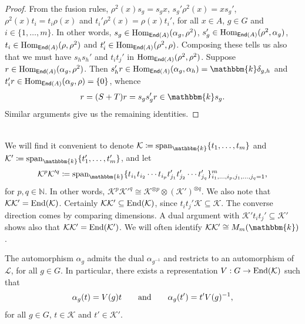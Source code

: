 \noindent\begin{proof} From the fusion rules, $\rho^2(x)s_g = s_gx$, $s_g'\rho^2(x) = xs_g'$, $\rho^2(x)t_i = t_i\rho(x)$ and $t_i'\rho^2(x) = \rho(x)t_i'$, for all $x \in A$, $g \in G$ and $i \in \{1, \dots, m\}$. In other words, $s_g \in \textup{Hom}_{\textup{\textsf{End}}(A)}(\alpha_g, \rho^2)$, $s_g' \in \textup{Hom}_{\textup{\textsf{End}}(A)}(\rho^2, \alpha_g)$, $t_i \in \textup{Hom}_{\textup{\textsf{End}}(A)}(\rho, \rho^2)$ and $t_i' \in \textup{Hom}_{\textup{\textsf{End}}(A)}(\rho^2, \rho)$. Composing these tells us also that we must have $s_hs_h'$ and $t_it_j'$ in $\textup{Hom}_{\textup{\textsf{End}}(A)}(\rho^2, \rho^2)$. Suppose $r \in \textup{Hom}_{\textup{\textsf{End}}(A)}(\alpha_g, \rho^2)$. Then $s_h'r \in \homset_{\textcat{End}(A)}(\alpha_g, \alpha_h) = \mathbbm{k}\delta_{g,h}$ and $t_i'r \in \textup{Hom}_{\textup{\textsf{End}}(A)}(\alpha_g, \rho) = \{0\}$, whence
\begin{align*}
r = (S + T)r = s_gs_g'r \in \mathbbm{k}s_g.
\end{align*}
\noindent Similar arguments give us the remaining identities. %
\end{proof}\\

\noindent We will find it convenient to denote $\mathcal{K} \coloneqq \textup{span}_\mathbbm{k}\{t_1, \dots, t_m\}$ and $\mathcal{K}' \coloneqq \textup{span}_\mathbbm{k}\{t_1', \dots, t_m'\}$, and let
\begin{align*}
\mathcal{K}^p\mathcal{K}'^q \coloneqq \textup{span}_\mathbbm{k}\{t_{i_1}t_{i_2} \cdots t_{i_p}t_{j_1}'t_{j_2}' \cdots t_{j_q}'\}_{i_1,\dots,i_p,j_1,\dots,j_q=1}^m,
\end{align*}
\noindent for $p, q \in \mathbb{N}$. In other words, $\mathcal{K}^p\mathcal{K}'^q \cong \mathcal{K}^{\otimes p} \otimes (\mathcal{K}')^{\otimes q}$. We also note that $\mathcal{K}\mathcal{K}' = \textup{End}(\mathcal{K})$. Certainly $\mathcal{K}\mathcal{K}' \subseteq \textup{End}(\mathcal{K})$, since $t_it_j'\mathcal{K} \subseteq \mathcal{K}$. The converse direction comes by comparing dimensions. A dual argument with $\mathcal{K}'t_it_j' \subseteq \mathcal{K}'$ shows also that $\mathcal{K}\mathcal{K}' = \textup{End}(\mathcal{K}')$. We will often identify $\mathcal{K}\mathcal{K}' \cong M_m(\mathbbm{k})$.\\

\noindent\begin{lemma} The automorphism $\alpha_g$ admits the dual $\alpha_{g^{-1}}$ and restricts to an automorphism of $\mathcal{L}$, for all $g \in G$. In particular, there exists a representation $V : G \to \textup{End}(\mathcal{K})$ such that
\begin{gather*}
\alpha_g(t) = V(g)t\qquad\textup{and}\qquad\alpha_g(t') = t'V(g)^{-1},
\end{gather*}
\noindent for all $g \in G$, $t \in \mathcal{K}$ and $t' \in \mathcal{K}'$.\\
\end{lemma}

